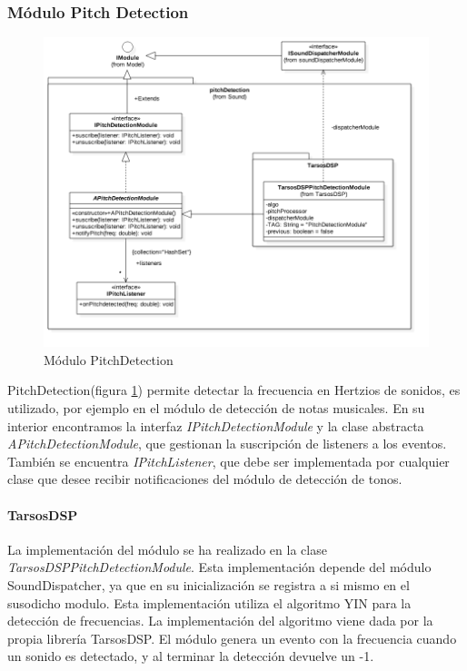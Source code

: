 \subsubsection{Módulo Pitch Detection}
\begin{figure}
	\centering
	\includegraphics[width=1\linewidth]{imagenes/diagramas/PitchDetectionModule.png}
	\caption{Módulo PitchDetection}
	\label{fig:pitch-detection-module}
\end{figure}
PitchDetection(figura \ref{fig:pitch-detection-module}) permite detectar la frecuencia en Hertzios de sonidos, es utilizado, por ejemplo en el módulo de detección de notas musicales.
En su interior encontramos la interfaz \textit{IPitchDetectionModule} y la clase abstracta \textit{APitchDetectionModule}, que gestionan la suscripción de listeners a los eventos. También se encuentra \textit{IPitchListener}, que debe ser implementada por cualquier clase que desee recibir notificaciones del módulo de detección de tonos.

\paragraph*{TarsosDSP \\}
La implementación del módulo se ha realizado en la clase \textit{TarsosDSPPitchDetectionModule}. Esta implementación depende del módulo SoundDispatcher, ya que en su inicialización se registra a si mismo en el susodicho modulo.
Esta implementación utiliza el algoritmo YIN \cite{de_YINa_f2002} para la detección de frecuencias. La implementación del algoritmo viene dada por la propia librería TarsosDSP. El módulo genera un evento con la frecuencia cuando un sonido es detectado, y al terminar la detección devuelve un -1.

